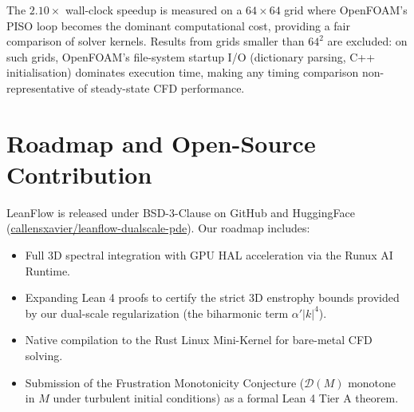 \documentclass[11pt,a4paper]{article}
\begin{document}
The $2.10\times$ wall-clock speedup is measured on a $64 \times 64$ grid where OpenFOAM's
PISO loop becomes the dominant computational cost, providing a fair comparison of solver
kernels. Results from grids smaller than $64^2$ are excluded: on such grids, OpenFOAM's
file-system startup I/O (dictionary parsing, C++ initialisation) dominates execution time,
making any timing comparison non-representative of steady-state CFD performance.

\section{Roadmap and Open-Source Contribution}
LeanFlow is released under BSD-3-Clause on GitHub and HuggingFace
(\href{https://huggingface.co/callensxavier/leanflow-dualscale-pde}%
{callensxavier/leanflow-dualscale-pde}). Our roadmap includes:
\begin{itemize}
    \item Full 3D spectral integration with GPU HAL acceleration via the Runux AI Runtime.
    \item Expanding Lean 4 proofs to certify the strict 3D enstrophy bounds provided by our
          dual-scale regularization (the biharmonic term $\alpha'|k|^4$).
    \item Native compilation to the Rust Linux Mini-Kernel for bare-metal CFD solving.
    \item Submission of the Frustration Monotonicity Conjecture ($\mathcal{D}(M)$ monotone in
          $M$ under turbulent initial conditions) as a formal Lean 4 Tier A theorem.
\end{itemize}
\end{document}

